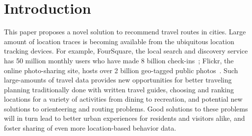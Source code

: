 
\section{Introduction}
\label{sec:intro}

This paper proposes a novel solution to recommend travel routes in cities. 
Large amount of location traces is becoming available from the ubiquitous location tracking devices. 
For example, FourSquare, the local search and discovery service has 50 million monthly users who have made 8 billion check-ins~\cite{4sq}; Flickr, the online photo-sharing site, hosts over 2 billion geo-tagged public photos~\cite{flickr}. Such large-amounts of travel data provides new opportunities for better 
traveling planning traditionally done with written travel guides, 
choosing and ranking locations for a variety of activities from dining to recreation, 
and potential new solutions to orienteering and routing problems. 
Good solutions to these problems will in turn lead to better urban experiences for residents and visitors alike, and foster sharing of even more location-based behavior data. 

